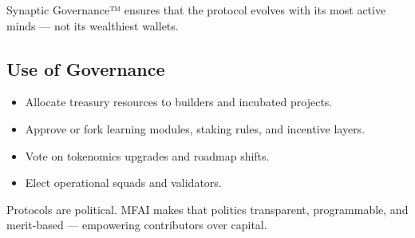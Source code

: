 \vspace{1em}

\begin{mfai-note}
Synaptic Governance™ ensures that the protocol evolves with its most active minds — not its wealthiest wallets.
\end{mfai-note}

\vspace{1em}

\subsection*{Use of Governance}

\begin{itemize}
  \item Allocate treasury resources to builders and incubated projects.
  \item Approve or fork learning modules, staking rules, and incentive layers.
  \item Vote on tokenomics upgrades and roadmap shifts.
  \item Elect operational squads and validators.
\end{itemize}

\vspace{2em}

\begin{mfai-warning}
Protocols are political. MFAI makes that politics transparent, programmable, and merit-based — empowering contributors over capital.
\end{mfai-warning}
